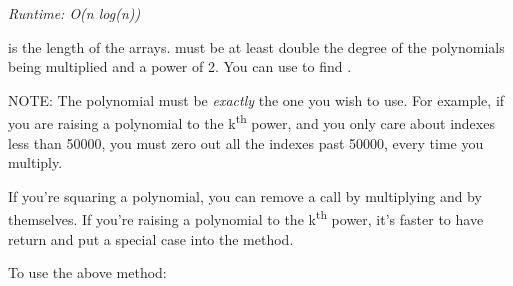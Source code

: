 
\textit{Runtime: O(n log(n))}

 is the length of the arrays.  must be at least double the degree of the polynomials being multiplied and a power of 2. You can use  to find .

NOTE: The polynomial must be \textit{exactly} the one you wish to use. For example, if you are raising a polynomial to the k\textsuperscript{th} power, and you only care about indexes less than 50000, you must zero out all the indexes past 50000, every time you multiply.

If you're squaring a polynomial, you can remove a  call by multiplying  and  by themselves. If you're raising a polynomial to the k\textsuperscript{th} power, it's faster to have  return  and put a special case into the  method.



To use the above method:




\newpage